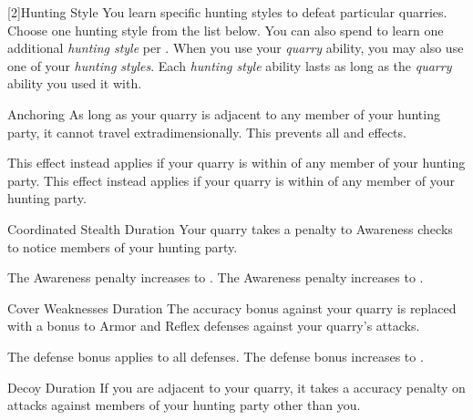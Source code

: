        [2]{Hunting Style}
        You learn specific hunting styles to defeat particular quarries.
        Choose one hunting style from the list below.
        You can also spend  to learn one additional \textit{hunting style} per .
        When you use your \textit{quarry} ability, you may also use one of your \textit{hunting styles}.
        Each \textit{hunting style} ability lasts as long as the \textit{quarry} ability you used it with.
        {
            \begin{durationability}{Anchoring}
                \rankline
                As long as your quarry is adjacent to any member of your hunting party, it cannot travel extradimensionally.
                This prevents all  and  effects.

                \rankline
                 This effect instead applies if your quarry is within \medrange of any member of your hunting party.
                 This effect instead applies if your quarry is within \distrange of any member of your hunting party.
            \end{durationability}

            \begin{durationability}{Coordinated Stealth}
                Duration
                \rankline
                Your quarry takes a  penalty to Awareness checks to notice members of your hunting party.

                \rankline
                 The Awareness penalty increases to .
                 The Awareness penalty increases to .
            \end{durationability}

            \begin{durationability}{Cover Weaknesses}
                Duration
                \rankline
                The accuracy bonus against your quarry is replaced with a  bonus to Armor and Reflex defenses against your quarry's attacks.

                \rankline
                 The defense bonus applies to all defenses.
                 The defense bonus increases to .
            \end{durationability}

            \begin{durationability}{Decoy}
                Duration
                \rankline
                If you are adjacent to your quarry, it takes a  accuracy penalty on attacks against members of your hunting party other than you.


\end{durationability}}
